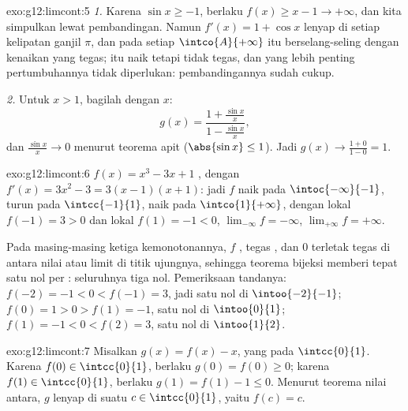 \begin{solution}{exo:g12:limcont:5}
\emph{1.} Karena $\sin x \geq -1$, berlaku $f(x) \geq x - 1 \to +\infty$, dan
kita simpulkan lewat pembandingan. Namun $f'(x) = 1 + \cos x$ lenyap di setiap
kelipatan ganjil $\pi$, dan pada setiap  $\intco{A}{+\infty}$ 
itu berselang-seling dengan  kenaikan yang tegas;  itu naik tetapi
tidak tegas, dan yang lebih penting pertumbuhannya tidak diperlukan: pembandingannya sudah cukup.

\emph{2.} Untuk $x > 1$, bagilah dengan $x$:
\[
g(x) = \frac{1 + \frac{\sin x}{x}}{1 - \frac{\sin x}{x}},
\]
dan $\frac{\sin x}{x} \to 0$ menurut teorema apit
($\abs{\sin x} \leq 1$). Jadi $g(x) \to \frac{1+0}{1-0} = 1$.
\end{solution}

\begin{solution}{exo:g12:limcont:6}
$f(x) = x^3 - 3x + 1$ , dengan $f'(x) = 3x^2 - 3 = 3(x-1)(x+1)$:
jadi $f$ naik pada $\intoc{-\infty}{-1}$, turun pada $\intcc{-1}{1}$,
naik pada $\intco{1}{+\infty}$, dengan  lokal $f(-1) = 3 > 0$ dan
 lokal $f(1) = -1 < 0$, $\lim_{-\infty} f = -\infty$,
$\lim_{+\infty} f = +\infty$.

Pada masing-masing ketiga  kemonotonannya, $f$ , tegas
, dan $0$ terletak tegas di antara nilai atau limit di titik ujungnya,
sehingga teorema bijeksi memberi tepat satu nol per : seluruhnya tiga
nol. Pemeriksaan tandanya: $f(-2) = -1 < 0 < f(-1) = 3$, jadi satu nol di
$\intoo{-2}{-1}$; $f(0) = 1 > 0 > f(1) = -1$, satu nol di $\intoo{0}{1}$;
$f(1) = -1 < 0 < f(2) = 3$, satu nol di $\intoo{1}{2}$.
\end{solution}

\begin{solution}{exo:g12:limcont:7}
Misalkan $g(x) = f(x) - x$, yang  pada $\intcc{0}{1}$. Karena
$f(0) \in \intcc{0}{1}$, berlaku $g(0) = f(0) \geq 0$; karena
$f(1) \in \intcc{0}{1}$, berlaku $g(1) = f(1) - 1 \leq 0$. Menurut teorema
nilai antara, $g$ lenyap di suatu $c \in \intcc{0}{1}$, yaitu $f(c) = c$.
\end{solution}

